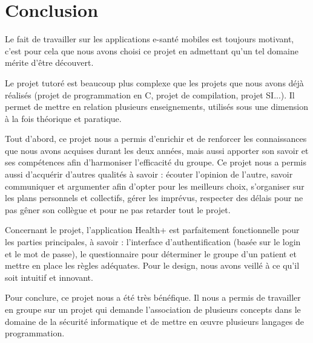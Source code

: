 
\chapter*{Conclusion}

Le fait de travailler sur les applications e-santé mobiles est toujours motivant, c’est pour cela que nous avons choisi ce projet en admettant qu'un tel domaine mérite d'être découvert.

\vspace{6pt}
\paragraphmark

Le projet tutoré est beaucoup plus complexe que les projets que nous avons déjà réalisés (projet de programmation en C, projet de compilation, projet SI...). Il permet de mettre en relation plusieurs enseignements, utilisés sous une dimension à la fois théorique et paratique.

\vspace{6pt}
\paragraphmark

Tout d’abord, ce projet nous a permis d’enrichir et de renforcer les connaissances que nous avons acquises durant les deux années, mais aussi apporter son savoir et ses compétences afin d’harmoniser l’efficacité du groupe. Ce projet nous a permis aussi d’acquérir d’autres qualités à savoir : écouter l’opinion de l’autre, savoir communiquer et argumenter afin d’opter pour les meilleurs choix, s’organiser sur les plans personnels et collectifs, gérer les imprévus, respecter des délais pour ne pas gêner son collègue et pour ne pas retarder tout le projet.

\vspace{6pt}
\paragraphmark

Concernant le projet, l'application Health+ est parfaitement fonctionnelle pour les parties principales, à savoir : l'interface d'authentification (basée sur le login et le mot de passe), le questionnaire pour déterminer le groupe d'un patient et mettre en place les règles adéquates. Pour le design, nous avons veillé à ce qu’il soit intuitif et innovant.

\vspace{6pt}
\paragraphmark

Pour conclure, ce projet nous a été très bénéfique. Il nous a permis de travailler en groupe sur un projet qui demande l’association de plusieurs concepts dans le domaine de la sécurité informatique et de mettre en œuvre plusieurs langages de programmation.